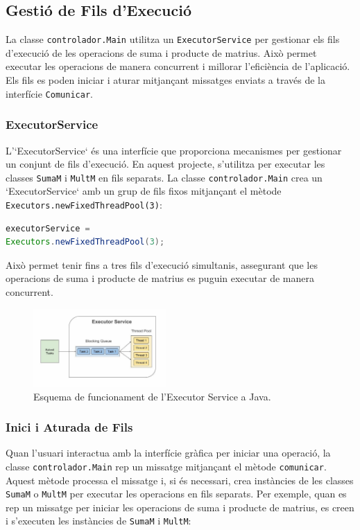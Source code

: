 \documentclass{ieeetj}
\begin{document}
\subsection{Gestió de Fils d'Execució}
La classe \texttt{controlador.Main} utilitza un \texttt{ExecutorService} per gestionar els fils d'execució de les operacions de suma i producte de matrius. Això permet executar les operacions de manera concurrent i millorar l'eficiència de l'aplicació. Els fils es poden iniciar i aturar mitjançant missatges enviats a través de la interfície \texttt{Comunicar}.

\subsubsection{ExecutorService}
L'`ExecutorService` és una interfície que proporciona mecanismes per gestionar un conjunt de fils d'execució. En aquest projecte, s'utilitza per executar les classes \texttt{SumaM} i \texttt{MultM} en fils separats. La classe \texttt{controlador.Main} crea un `ExecutorService` amb un grup de fils fixos mitjançant el mètode \texttt{Executors.newFixedThreadPool(3)}:

\begin{lstlisting}[language=Java, basicstyle=\ttfamily\normalsize]
executorService = 
Executors.newFixedThreadPool(3);
\end{lstlisting}

Això permet tenir fins a tres fils d'execució simultanis, assegurant que les operacions de suma i producte de matrius es puguin executar de manera concurrent.

\begin{figure}[htbp]
\centerline{\includegraphics[width=0.45\textwidth]{png/executorService.png}}
\caption{Esquema de funcionament de l'Executor Service a Java.}
\label{fig:exeServ}
\end{figure}

\subsubsection{Inici i Aturada de Fils}
Quan l'usuari interactua amb la interfície gràfica per iniciar una operació, la classe \texttt{controlador.Main} rep un missatge mitjançant el mètode \texttt{comunicar}. Aquest mètode processa el missatge i, si és necessari, crea instàncies de les classes \texttt{SumaM} o \texttt{MultM} per executar les operacions en fils separats. Per exemple, quan es rep un missatge per iniciar les operacions de suma i producte de matrius, es creen i s'executen les instàncies de \texttt{SumaM} i \texttt{MultM}:
\end{document}
